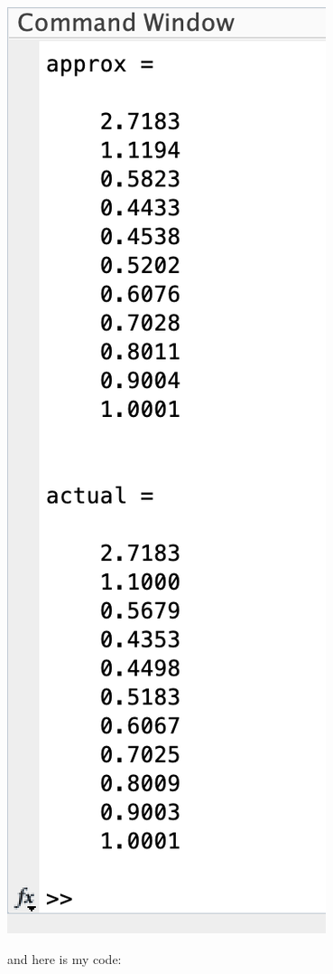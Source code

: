 \documentclass{article}
\begin{document}
\begin{answer}
\begin{center}
            \includegraphics[scale=0.5]{q6}
        \end{center}
        and here is my code:
        \inputminted{matlab}{./code/RKfourth.m}
        \inputminted{matlab}{./code/q5f.m}
        \inputminted{matlab}{./code/q5actf.m}
        \inputminted{matlab}{./code/evalActStiff.m}
        \inputminted{matlab}{./code/script7.m}
    \end{answer}
\end{document}
